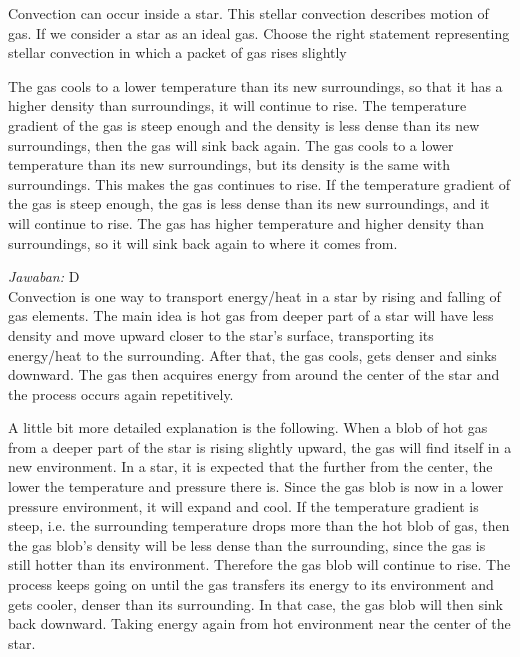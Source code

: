 \documentclass[11pt,fleqn]{exam}
\begin{document}
\begin{questions}
\question Convection can occur inside a star. This stellar convection describes motion of gas. If we consider a star as an ideal gas. Choose the right statement representing stellar convection in which a packet of gas rises slightly
\begin{choices}
\choice The gas cools to a lower temperature than its new surroundings, so that it has a higher density than surroundings, it will continue to rise.
\choice The temperature gradient of the gas is steep enough and the density is less dense than its new surroundings, then the gas will sink back again.
\choice The gas cools to a lower temperature than its new surroundings, but its density is the same with surroundings. This makes the gas continues to rise.
\choice If the temperature gradient of the gas is steep enough, the gas is less dense than its new surroundings, and it will continue to rise.
\choice The gas has higher temperature and higher density than surroundings, so it will sink back again to where it comes from.
\end{choices}

\textit{Jawaban: }D\\
Convection is one way to transport energy/heat in a star by rising and falling of gas elements. The main idea is hot gas from deeper part of a star will have less density and move upward closer to the star's surface, transporting its energy/heat to the surrounding. After that, the gas cools, gets denser and sinks downward. The gas then acquires energy from around the center of the star and the process occurs again repetitively.

A little bit more detailed explanation is the following. When a blob of hot gas from a deeper part of the star is rising slightly upward, the gas will find itself in a new environment. In a star, it is expected that the further from the center, the lower the temperature and pressure there is.  Since the gas blob is now in a lower pressure environment, it will expand and cool. If the temperature gradient is steep, i.e. the surrounding temperature drops more than the hot blob of gas, then the gas blob's density will be less dense than the surrounding, since the gas is still hotter than its environment. Therefore the gas blob will continue to rise. The process keeps going on until the gas transfers its energy to its environment and gets cooler, denser than its surrounding. In that case, the gas blob will then sink back downward. Taking energy again from hot environment near the center of the star.


\end{questions}
\end{document}
